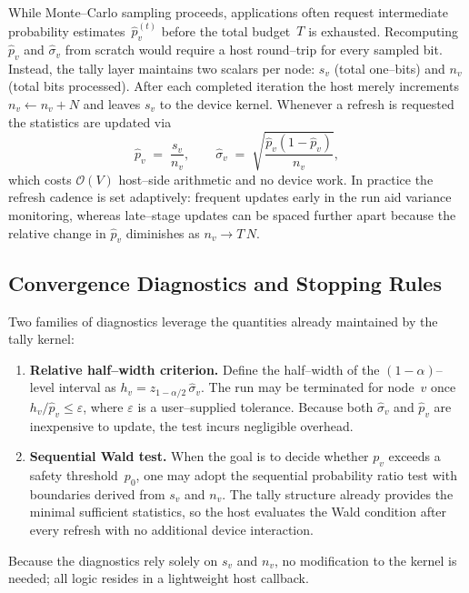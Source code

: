 While Monte--Carlo sampling proceeds, applications often request intermediate
probability estimates~\(\widehat{p}_v^{(t)}\) before the total budget~\(T\) is
exhausted.  Recomputing \(\widehat{p}_v\) and
\(\widehat{\sigma}_v\) from scratch would require a host round--trip for every
sampled bit.  Instead, the tally layer maintains two scalars per node:
\(s_v\) (total one--bits) and \(n_v\) (total bits processed).  After each
completed iteration the host merely increments \(n_v\gets n_v + N\) and leaves
\(s_v\) to the device kernel.  Whenever a refresh is requested the statistics
are updated via
\[
  \widehat{p}_v\;=\;\frac{s_v}{n_v},
  \qquad
  \widehat{\sigma}_v\;=\;\sqrt{\frac{\widehat{p}_v(1-\widehat{p}_v)}{n_v}},
\]
which costs \(\mathcal{O}(V)\) host--side arithmetic and no device work.  In
practice the refresh cadence is set adaptively: frequent updates early in the
run aid variance monitoring, whereas late--stage updates can be spaced further
apart because the relative change in \(\widehat{p}_v\) diminishes as
\(n_v\to T\,N\).

\subsection{Convergence Diagnostics and Stopping Rules}
\label{subsec:tally_convergence}

Two families of diagnostics leverage the quantities already maintained by the
tally kernel:
\begin{enumerate}
  \item\textbf{Relative half--width criterion.}  Define the
        half--width of the \((1-\alpha)\)--level interval as
        \(h_v= z_{1-\alpha/2}\,\widehat{\sigma}_v\).  The run may be terminated
        for node~\(v\) once \(h_v/\widehat{p}_v\le \varepsilon\), where
        \(\varepsilon\) is a user--supplied tolerance.  Because both
        \(\widehat{\sigma}_v\) and \(\widehat{p}_v\) are inexpensive to update,
        the test incurs negligible overhead.
  \item\textbf{Sequential Wald test.}  When the goal is to decide whether
        \(p_v\) exceeds a safety threshold~\(p_0\), one may adopt the
        sequential probability ratio test with boundaries derived from
        \(s_v\) and \(n_v\).  The tally structure already provides the minimal
        sufficient statistics, so the host evaluates the Wald condition after
        every refresh with no additional device interaction.
\end{enumerate}
Because the diagnostics rely solely on \(s_v\) and \(n_v\), no modification to
the kernel is needed; all logic resides in a lightweight host callback.


